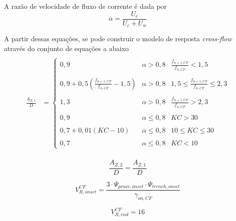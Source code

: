 A razão de velocidade de fluxo de corrente é dada por
\begin{equation}
\label{eq:viv-alfa}
\alpha = \frac{U_c}{U_c + U_w}
\end{equation}

A partir dessas equações, se pode construir o modelo de resposta \textit{cross-flow} através do conjunto de equações a abaixo
\begin{equation}
\label{eq:viv-azdj}
\begin{aligned}
\\
\frac{A_{Z,1}}{D} &=
\left\{
\begin{array}{ccc}
0,9                                                      & \alpha > 0,8   &         \frac{f_{n+1,CF}}{f_{n,CF}} <   1,5 \\
\\
0,9 + 0,5 \left(\frac{f_{n+1,CF}}{f_{n,CF}} - 1,5\right) & \alpha > 0,8   & 1,5 \le \frac{f_{n+1,CF}}{f_{n,CF}} \le 2,3 \\
\\
1,3                                                      & \alpha > 0,8   &         \frac{f_{n+1,CF}}{f_{n,CF}} >   2,3 \\
\\
0,9                                                      & \alpha \le 0,8 &        \mathit{KC} >   30 \\
\\
0,7 + 0,01 (\mathit{KC} -10)                             & \alpha \le 0,8 & 10 \le \mathit{KC} \le 30 \\
\\
0,7                                                      & \alpha \le 0,8 &        \mathit{KC} <   10
\end{array}
\right.\\
\end{aligned}
\end{equation}

\begin{equation}
\frac{A_{Z,2}}{D} = \frac{A_{Z,1}}{D}
\end{equation}

\begin{equation}
V_{R,\mathit{onset}}^\mathit{CF} = \frac{3 \cdot \Psi_{\mathit{proxi}, \mathit{onset}} \cdot  \Psi_{\mathit{trench}, \mathit{onset}}}{\gamma_{\mathit{on}, \mathit{CF}}}
\end{equation}

\begin{equation}
V_{R,\mathit{end}}^\mathit{CF} = 16
\end{equation}

